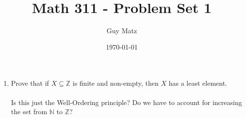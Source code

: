 \documentclass[11pt]{article}
\title{\textbf{Math 311 - Problem Set 1}}
\author{Guy Matz}
\date{\today}
\begin{document}


\begin{enumerate}  %
\item Prove that if $X \subseteq \mathbb{Z}$ is finite and non-empty, then $X$ has a least element.\\
\\
Is this just the Well-Ordering principle?  Do we have to account for increasing the set from $\mathbb{N}$ to $\mathbb{Z}$?
\end{enumerate} %
\end{document}
